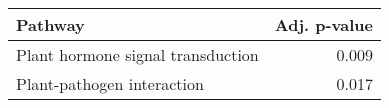 \begin{tabular}{lr}
\toprule
                           Pathway &  Adj. p-value \\
\midrule
 Plant hormone signal transduction &         0.009 \\
        Plant-pathogen interaction &         0.017 \\
\bottomrule
\end{tabular}

